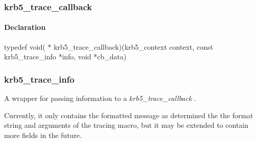 \documentclass[letterpaper,10pt,english]{sphinxmanual}
\begin{document}

\begin{fulllineitems}
\label{appdev/refs/types/krb5_tkt_authent:krb5_tkt_authent.ap_options}
\end{fulllineitems}



\subsubsection{krb5\_trace\_callback}
\label{appdev/refs/types/krb5_trace_callback:krb5-trace-callback-struct}\label{appdev/refs/types/krb5_trace_callback:krb5-trace-callback}\label{appdev/refs/types/krb5_trace_callback::doc}

\begin{fulllineitems}
\label{appdev/refs/types/krb5_trace_callback:krb5_trace_callback}
\end{fulllineitems}



\paragraph{Declaration}
\label{appdev/refs/types/krb5_trace_callback:declaration}
typedef void( * krb5\_trace\_callback)(krb5\_context context, const krb5\_trace\_info *info, void *cb\_data)


\subsubsection{krb5\_trace\_info}
\label{appdev/refs/types/krb5_trace_info:krb5-trace-info-struct}\label{appdev/refs/types/krb5_trace_info::doc}\label{appdev/refs/types/krb5_trace_info:krb5-trace-info}

\begin{fulllineitems}
\label{appdev/refs/types/krb5_trace_info:krb5_trace_info}
\end{fulllineitems}


A wrapper for passing information to a \emph{krb5\_trace\_callback} .

Currently, it only contains the formatted message as determined the the format string and arguments of the tracing macro, but it may be extended to contain more fields in the future.
\end{document}
